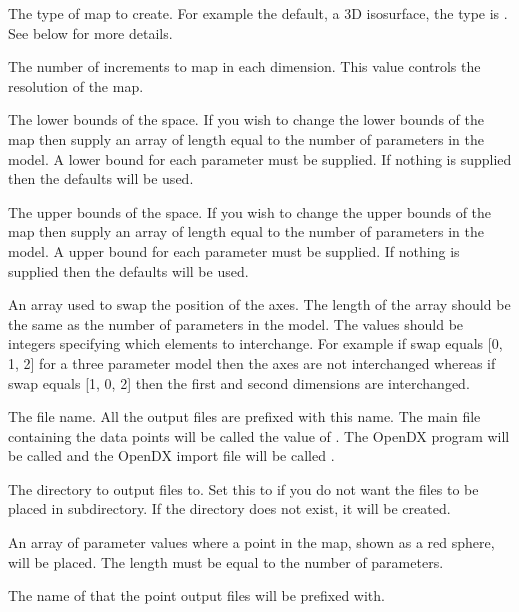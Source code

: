   The type of map to create.  For example the default, a 3D isosurface, the type is .  See below for more details. 

  The number of increments to map in each dimension.  This value controls the resolution of the map. 

  The lower bounds of the space.  If you wish to change the lower bounds of the map then supply an array of length equal to the number of parameters in the model.  A lower bound for each parameter must be supplied.  If nothing is supplied then the defaults will be used. 

  The upper bounds of the space.  If you wish to change the upper bounds of the map then supply an array of length equal to the number of parameters in the model.  A upper bound for each parameter must be supplied.  If nothing is supplied then the defaults will be used. 

  An array used to swap the position of the axes.  The length of the array should be the same as the number of parameters in the model.  The values should be integers specifying which elements to interchange.  For example if swap equals [0, 1, 2] for a three parameter model then the axes are not interchanged whereas if swap equals [1, 0, 2] then the first and second dimensions are interchanged. 

  The file name.  All the output files are prefixed with this name.  The main file containing the data points will be called the value of .  The OpenDX program will be called  and the OpenDX import file will be called . 

  The directory to output files to.  Set this to  if you do not want the files to be placed in subdirectory.  If the directory does not exist, it will be created. 

  An array of parameter values where a point in the map, shown as a red sphere, will be placed.  The length must be equal to the number of parameters. 

  The name of that the point output files will be prefixed with. 


